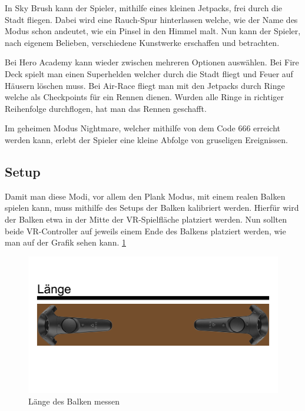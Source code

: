 In Sky Brush kann der Spieler, mithilfe eines kleinen Jetpacks, frei durch die Stadt fliegen.
Dabei wird eine Rauch-Spur hinterlassen welche, wie der Name des Modus schon andeutet, wie ein Pinsel in den Himmel malt.
Nun kann der Spieler, nach eigenem Belieben, verschiedene Kunstwerke erschaffen und betrachten.
~\cite{ToastGames_2021_Steam}

Bei Hero Academy kann wieder zwischen mehreren Optionen auswählen.
Bei Fire Deck spielt man einen Superhelden welcher durch die Stadt fliegt und Feuer auf Häusern löschen muss.
Bei Air-Race fliegt man mit den Jetpacks durch Ringe welche als Checkpoints für ein Rennen dienen.
Wurden alle Ringe in richtiger Reihenfolge durchflogen, hat man das Rennen geschafft.
~\cite{ToastGames_2021_Steam}

Im geheimen Modus Nightmare, welcher mithilfe von dem Code 666 erreicht werden kann, erlebt der Spieler eine kleine Abfolge von gruseligen Ereignissen.
~\cite{ToastGames_2021_VivePort}

\subsection{Setup}
\label{sec:richiesplankexperience_setup}

Damit man diese Modi, vor allem den Plank Modus, mit einem realen Balken spielen kann, muss mithilfe des Setups der Balken kalibriert werden.
Hierfür wird der Balken etwa in der Mitte der VR-Spielfläche platziert werden.
Nun sollten beide VR-Controller auf jeweils einem Ende des Balkens platziert werden, wie man auf der Grafik sehen kann.
\ref{fig:beam_length_measurement} %

\begin {figure}
    \includegraphics[scale=0.18]{pics/beam_length_measurement}
    \caption{L\"ange des Balken messen}
    \label{fig:beam_length_measurement}
\end {figure}

